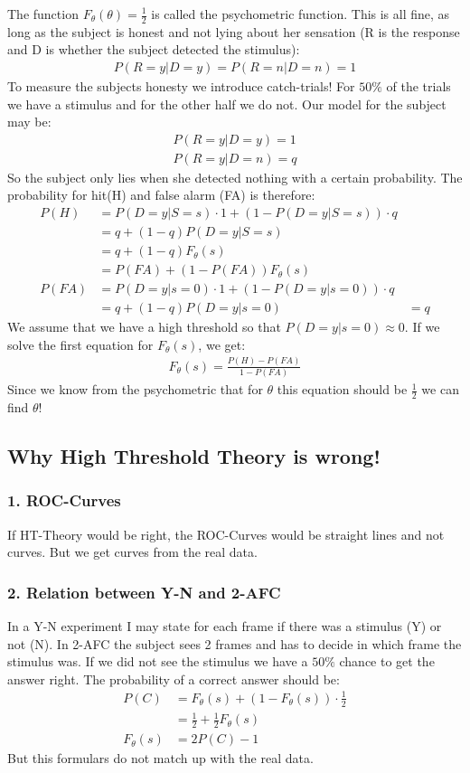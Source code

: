 \documentclass[../main/Notes.tex]{subfiles}
\begin{document}
\bigskip
The function $F_\theta(\theta)=\frac{1}{2}$ is called the psychometric function. This is all fine, as long as the subject is honest and not lying about her sensation (R is the response and D is whether the subject detected the stimulus):
\begin{align*}
P(R=y|D=y)=P(R=n|D=n)=1
\end{align*}
To measure the subjects honesty we introduce catch-trials! For $50\%$ of the trials we have a stimulus and for the other half we do not. Our model for the subject may be:
\begin{align*}
P(R=y|D=y)=1\\
P(R=y|D=n)=q
\end{align*}
So the subject only lies when she detected nothing with a certain probability. The probability for hit(H) and false alarm (FA) is therefore:
\begin{align*}
P(H)&=P(D=y|S=s)\cdot 1+(1-P(D=y|S=s))\cdot q\\
    &=q+(1-q)P(D=y|S=s)\\
    &=q+(1-q)F_\theta(s)\\
    &=P(FA)+(1-P(FA))F_\theta(s)\\
P(FA)&=P(D=y|s=0)\cdot 1 + (1-P(D=y|s=0))\cdot q\\
     &=q+(1-q)P(D=y|s=0)
     &=q
\end{align*}
We assume that we have a high threshold so that $P(D=y|s=0)\approx 0$. If we solve the first equation for $F_\theta(s)$, we get:
\begin{align*}
F_\theta(s)=\frac{P(H)-P(FA)}{1-P(FA)}
\end{align*}
Since we know from the psychometric that for $\theta$ this equation should be $\frac{1}{2}$ we can find $\theta$!

\subsection{Why High Threshold Theory is wrong!}
\subsubsection*{1. ROC-Curves}
If HT-Theory would be right, the ROC-Curves would be straight lines and not curves. But we get curves from the real data.
\subsubsection*{2. Relation between Y-N and 2-AFC}
In a Y-N experiment I may state for each frame if there was a stimulus (Y) or not (N). In 2-AFC the subject sees 2 frames and has to decide in which frame the stimulus was. If we did not see the stimulus we have a $50\%$ chance to get the answer right. The probability of a correct answer should be:
\begin{align*}
P(C) &=F_\theta(s)+(1-F_\theta(s))\cdot\frac{1}{2}\\
     &=\frac{1}{2} + \frac{1}{2}F_\theta(s)\\
F_\theta(s)&=2P(C)-1    
\end{align*}
But this formulars do not match up with the real data.
\end{document}
